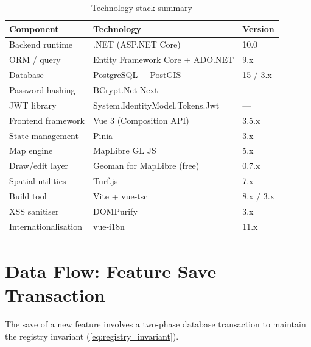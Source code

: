 \documentclass[12pt,a4paper]{article}
\theoremstyle{definition}
\theoremstyle{plain}
\theoremstyle{remark}
\begin{document}
\begin{table}[H]
\centering
\caption{Technology stack summary}
\label{tab:stack}
\begin{tabular}{lll}
\toprule
\textbf{Component} & \textbf{Technology} & \textbf{Version} \\
\midrule
Backend runtime        & .NET (ASP.NET Core)          & 10.0 \\
ORM / query            & Entity Framework Core + ADO.NET & 9.x \\
Database               & PostgreSQL + PostGIS          & 15 / 3.x \\
Password hashing       & BCrypt.Net-Next               & --- \\
JWT library            & System.IdentityModel.Tokens.Jwt & --- \\
Frontend framework     & Vue 3 (Composition API)       & 3.5.x \\
State management       & Pinia                         & 3.x \\
Map engine             & MapLibre GL JS                & 5.x \\
Draw/edit layer        & Geoman for MapLibre (free)    & 0.7.x \\
Spatial utilities      & Turf.js                       & 7.x \\
Build tool             & Vite + vue-tsc                & 8.x / 3.x \\
XSS sanitiser          & DOMPurify                     & 3.x \\
Internationalisation   & vue-i18n                      & 11.x \\
\bottomrule
\end{tabular}
\end{table}

\section{Data Flow: Feature Save Transaction}
\label{sec:save_transaction}

The save of a new feature involves a two-phase database transaction to
maintain the registry invariant (\cref{eq:registry_invariant}).
\end{document}

